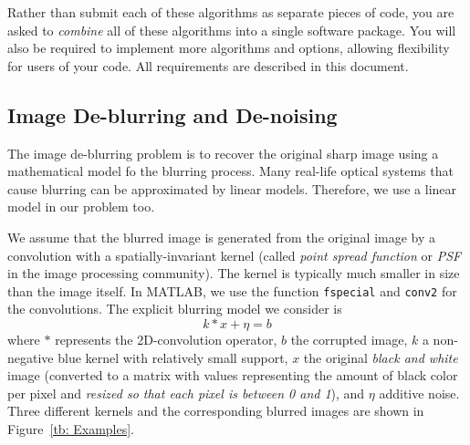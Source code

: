 \documentclass[12pt]{article}
\begin{document}
 Rather than submit each of these algorithms as separate pieces of code, you are asked to \emph{combine} all of these algorithms into a single software package.  You will also be required to implement more algorithms and options, allowing flexibility for users of your code.  All requirements are described in this document.

\subsection{Image De-blurring and De-noising} 
The image de-blurring problem is to recover the original sharp image using a mathematical model fo the blurring process. Many real-life optical systems that cause blurring can be approximated by linear models. Therefore, we use a linear model in our problem too. 

We assume that the blurred image is generated from the original image by a convolution with a spatially-invariant kernel (called \textit{point spread function} or \textit{PSF} in the image processing community). The kernel is typically much smaller in size than the image itself. In MATLAB, we use the function \texttt{fspecial} and \texttt{conv2} for the convolutions. The explicit blurring model we consider is 
\[k * x + \eta = b\]
where $*$ represents the 2D-convolution operator, $b$ the corrupted image, $k$ a non-negative blue kernel with relatively small support, $x$ the original \textit{black and white} image (converted to a matrix with values representing the amount of black color per pixel and \textit{resized so that each pixel is between 0 and 1}), and $\eta$ additive noise. Three different kernels and the corresponding blurred images are shown in Figure~\ref{tb: Examples}.
\end{document}
